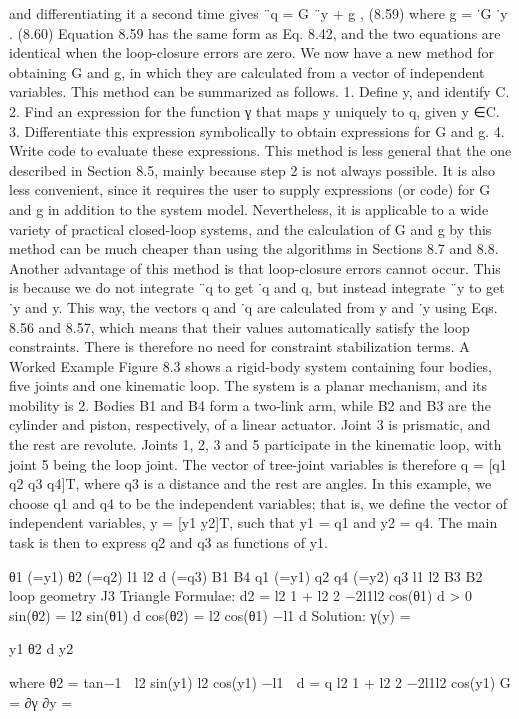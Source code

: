 and differentiating it a second time gives ¨q = G ¨y + g , (8.59) where g = ˙G ˙y . (8.60) Equation 8.59 has the same form as Eq. 8.42, and the two equations are identical when the loop-closure errors are zero. We now have a new method for obtaining G and g, in which they are calculated from a vector of independent variables. This method can be summarized as follows. 1. Define y, and identify C. 2. Find an expression for the function γ that maps y uniquely to q, given y ∈C. 3. Differentiate this expression symbolically to obtain expressions for G and g. 4. Write code to evaluate these expressions. This method is less general that the one described in Section 8.5, mainly because step 2 is not always possible. It is also less convenient, since it requires the user to supply expressions (or code) for G and g in addition to the system model. Nevertheless, it is applicable to a wide variety of practical closed-loop systems, and the calculation of G and g by this method can be much cheaper than using the algorithms in Sections 8.7 and 8.8. Another advantage of this method is that loop-closure errors cannot occur. This is because we do not integrate ¨q to get ˙q and q, but instead integrate ¨y to get ˙y and y. This way, the vectors q and ˙q are calculated from y and ˙y using Eqs. 8.56 and 8.57, which means that their values automatically satisfy the loop constraints. There is therefore no need for constraint stabilization terms. A Worked Example Figure 8.3 shows a rigid-body system containing four bodies, five joints and one kinematic loop. The system is a planar mechanism, and its mobility is 2. Bodies B1 and B4 form a two-link arm, while B2 and B3 are the cylinder and piston, respectively, of a linear actuator. Joint 3 is prismatic, and the rest are revolute. Joints 1, 2, 3 and 5 participate in the kinematic loop, with joint 5 being the loop joint. The vector of tree-joint variables is therefore q = [q1 q2 q3 q4]T, where q3 is a distance and the rest are angles. In this example, we choose q1 and q4 to be the independent variables; that is, we define the vector of independent variables, y = [y1 y2]T, such that y1 = q1 and y2 = q4. The main task is then to express q2 and q3 as functions of y1.

θ1 (=y1) θ2 (=q2) l1 l2 d (=q3) B1 B4 q1 (=y1) q2 q4 (=y2) q3 l1 l2 B3 B2 loop geometry J3 Triangle Formulae: d2 = l2 1 + l2 2 −2l1l2 cos(θ1) d > 0 sin(θ2) = l2 sin(θ1) d cos(θ2) = l2 cos(θ1) −l1 d Solution: γ(y) =

y1 θ2 d y2

where θ2 = tan−1  l2 sin(y1) l2 cos(y1) −l1  d = q l2 1 + l2 2 −2l1l2 cos(y1) G = ∂γ ∂y =

